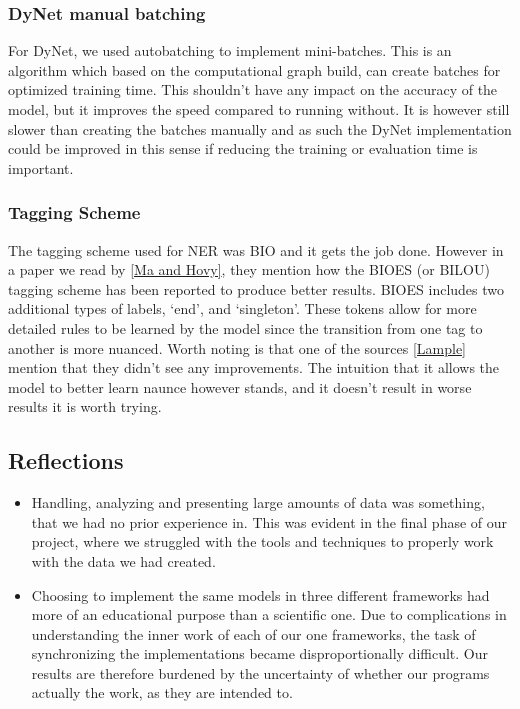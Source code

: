 \subsubsection{DyNet manual batching}

For DyNet, we used autobatching to implement mini-batches. This is an algorithm
which based on the computational graph build, can create batches for optimized
training time. This shouldn't have any impact on the accuracy of the model, but
it improves the speed compared to running without. It is however still slower
than creating the batches manually and as such the DyNet implementation could be
improved in this sense if reducing the training or evaluation time is important.

\subsubsection{Tagging Scheme}

The tagging scheme used for NER was BIO and it gets the job done. However in a
paper we read by \ref{Ma and Hovy}, they mention how the BIOES (or BILOU)
tagging scheme has been reported to produce better results. BIOES includes two
additional types of labels, `end', and `singleton'. These tokens allow for more
detailed rules to be learned by the model since the transition from one tag to
another is more nuanced. Worth noting is that one of the sources \ref{Lample}
mention that they didn't see any improvements. The intuition that it allows the
model to better learn naunce however stands, and it doesn't result in worse
results it is worth trying.

\subsection{Reflections}

\begin{itemize}
    \item Handling, analyzing and presenting large amounts of data was
        something, that we had no prior experience in. This was evident in the
        final phase of our project, where we struggled with the tools and
        techniques to properly work with the data we had created.
    \item Choosing to implement the same models in three different frameworks
        had more of an educational purpose than a scientific one. Due to
        complications in understanding the inner work of each of our one
        frameworks, the task of synchronizing the implementations became
        disproportionally difficult. Our results are therefore burdened by the
        uncertainty of whether our programs actually the work, as they are
        intended to.
\end{itemize}

\pagebreak
